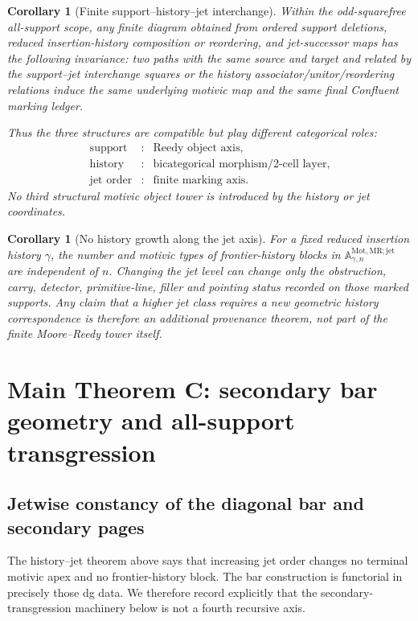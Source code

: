 \documentclass[11pt]{article}
\newtheorem{corollary}[theorem]{Corollary}
\theoremstyle{remark}
\newcommand{\Mot}{\mathrm{Mot}}
\newcommand{\MR}{\mathrm{MR}}
\begin{document}
\begin{corollary}[Finite support--history--jet interchange]
\label{P2M-cor:v35-support-history-jet-interchange}
Within the odd-squarefree all-support scope, any finite diagram obtained from
ordered support deletions, reduced insertion-history composition or reordering,
and jet-successor maps has the following invariance: two paths with the same
source and target and related by the support--jet interchange squares or the
history associator/unitor/reordering relations induce the same underlying
motivic map and the same final Confluent marking ledger.

Thus the three structures are compatible but play different categorical
roles:
\[
 \boxed{
 \begin{array}{ccl}
 \text{support} &:& \text{Reedy object axis},\\
 \text{history} &:& \text{bicategorical morphism/2-cell layer},\\
 \text{jet order} &:& \text{finite marking axis}.
 \end{array}}
\]
No third structural motivic object tower is introduced by the history or jet
coordinates.
\end{corollary}

\begin{corollary}[No history growth along the jet axis]
\label{P2M-cor:v35-no-history-growth-along-jet-axis}
For a fixed reduced insertion history $\gamma$, the number and motivic types of
frontier-history blocks in
$\mathbb A^{\Mot,\MR;\mathrm{jet}}_{\gamma,n}$ are independent of $n$.
Changing the jet level can change only the obstruction, carry, detector,
primitive-line, filler and pointing status recorded on those marked supports.
Any claim that a higher jet class requires a new geometric history
correspondence is therefore an additional provenance theorem, not part of the
finite Moore--Reedy tower itself.
\end{corollary}

\section{Main Theorem C: secondary bar geometry and all-support transgression}

\subsection{Jetwise constancy of the diagonal bar and secondary pages}

The history--jet theorem above says that increasing jet order changes no
terminal motivic apex and no frontier-history block.  The bar construction is
functorial in precisely those dg data.  We therefore record explicitly that
the secondary-transgression machinery below is not a fourth recursive axis.
\end{document}
